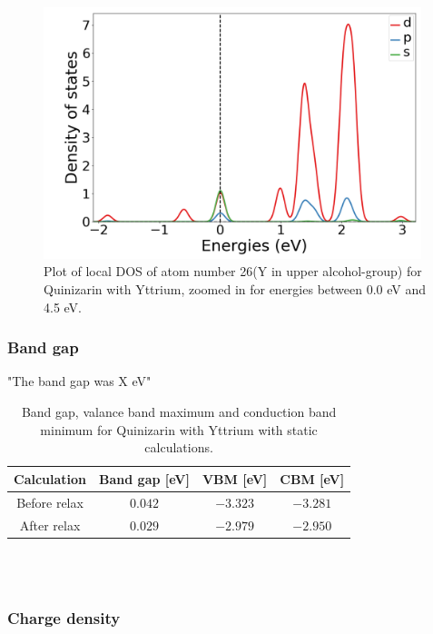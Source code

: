 \documentclass{article}
\begin{document}
      \begin{figure}[H]
          \centering
          \includegraphics[width = 11cm]{../fig/Y_LDOS26_2.png}
          \caption{Plot of local DOS of atom number 26(Y in upper alcohol-group) for Quinizarin with Yttrium, zoomed in for energies between 0.0 eV and 4.5 eV. }
          \label{fig:Y_LDOS26_2.png}
      \end{figure}


    \subsubsection{Band gap}

      "The band gap was X eV"

      \begin{table}[H]
        \centering
        \caption{Band gap, valance band maximum and conduction band minimum for Quinizarin with Yttrium with static calculations. }
        \vspace{0mm}
        \label{tab:bandgapY}
        \begin{tabular}{|c|c|c|c|}
            \hline
            Calculation & Band gap [eV] & VBM [eV] & CBM [eV]  \\
            \hline \hline
            Before relax & $0.042$ & $-3.323$ & $-3.281$ \\
            After relax & $0.029$ & $-2.979$ & $-2.950$ \\
            \hline
        \end{tabular} \\
        \hspace{0pt}\\
      \end{table}

    \subsubsection{Charge density}
\end{document}
